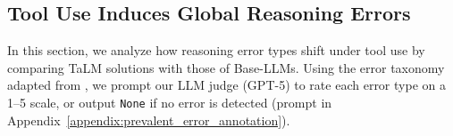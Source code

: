 \documentclass[11pt]{article}
\def \task{\textsc{TIM}\xspace}
\newcommand{\pouya}[1]{{\color{violet}Pouya: #1}}
\begin{document}


\subsection{Tool Use Induces Global Reasoning Errors}
\label{sec:error_type_analysis}
In this section, we analyze how reasoning error types shift under tool use by comparing TaLM solutions with those of Base-LLMs. 
Using the error taxonomy adapted from \citet{petrov2025proofbluffevaluatingllms}, we prompt our LLM judge (GPT-5) to rate each error type on a 1--5 scale, or output \texttt{None} if no error is detected (prompt in Appendix~\ref{appendix:prevalent_error_annotation}). 
\end{document}
